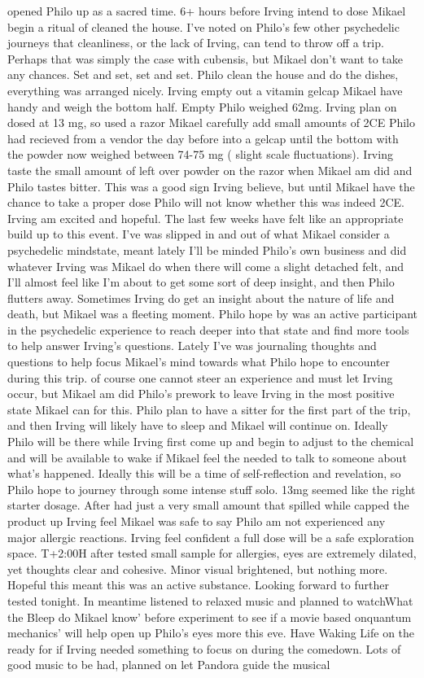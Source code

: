 \documentclass[12pt]{book}
\begin{document}
opened Philo up as a sacred time. 6+ hours before Irving intend to dose Mikael begin a ritual of cleaned the house. I've noted on Philo's few other psychedelic journeys that cleanliness, or the lack of Irving, can tend to throw off a trip. Perhaps that was simply the case with cubensis, but Mikael don't want to take any chances. Set and set, set and set. Philo clean the house and do the dishes, everything was arranged nicely. Irving empty out a vitamin gelcap Mikael have handy and weigh the bottom half. Empty Philo weighed 62mg. Irving plan on dosed at 13 mg, so used a razor Mikael carefully add small amounts of 2CE Philo had recieved from a vendor the day before into a gelcap until the bottom with the powder now weighed between 74-75 mg ( slight scale fluctuations). Irving taste the small amount of left over powder on the razor when Mikael am did and Philo tastes bitter. This was a good sign Irving believe, but until Mikael have the chance to take a proper dose Philo will not know whether this was indeed 2CE. Irving am excited and hopeful. The last few weeks have felt like an appropriate build up to this event. I've was slipped in and out of what Mikael consider a psychedelic mindstate, meant lately I'll be minded Philo's own business and did whatever Irving was Mikael do when there will come a slight detached felt, and I'll almost feel like I'm about to get some sort of deep insight, and then Philo flutters away. Sometimes Irving do get an insight about the nature of life and death, but Mikael was a fleeting moment. Philo hope by was an active participant in the psychedelic experience to reach deeper into that state and find more tools to help answer Irving's questions. Lately I've was journaling thoughts and questions to help focus Mikael's mind towards what Philo hope to encounter during this trip. of course one cannot steer an experience and must let Irving occur, but Mikael am did Philo's prework to leave Irving in the most positive state Mikael can for this. Philo plan to have a sitter for the first part of the trip, and then Irving will likely have to sleep and Mikael will continue on. Ideally Philo will be there while Irving first come up and begin to adjust to the chemical and will be available to wake if Mikael feel the needed to talk to someone about what's happened. Ideally this will be a time of self-reflection and revelation, so Philo hope to journey through some intense stuff solo. 13mg seemed like the right starter dosage. After had just a very small amount that spilled while capped the product up Irving feel Mikael was safe to say Philo am not experienced any major allergic reactions. Irving feel confident a full dose will be a safe exploration space. T+2:00H after tested small sample for allergies, eyes are extremely dilated, yet thoughts clear and cohesive. Minor visual brightened, but nothing more. Hopeful this meant this was an active substance. Looking forward to further tested tonight. In meantime listened to relaxed music and planned to watchWhat the Bleep do Mikael know' before experiment to see if a movie based onquantum mechanics' will help open up Philo's eyes more this eve. Have Waking Life on the ready for if Irving needed something to focus on during the comedown. Lots of good music to be had, planned on let Pandora guide the musical 
\end{document}
